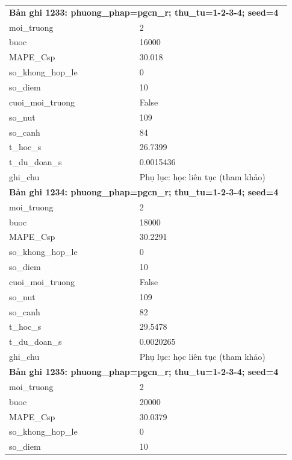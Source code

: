 \begin{longtable}{p{0.43\linewidth}p{0.50\linewidth}}
\midrule
\multicolumn{2}{p{0.95\linewidth}}{\textbf{Bản ghi 1233: phuong\_phap=pgcn\_r; thu\_tu=1-2-3-4; seed=4}} \\
moi\_\allowbreak truong & 2 \\
buoc & 16000 \\
MAPE\_\allowbreak Csp & 30.018 \\
so\_\allowbreak khong\_\allowbreak hop\_\allowbreak le & 0 \\
so\_\allowbreak diem & 10 \\
cuoi\_\allowbreak moi\_\allowbreak truong & False \\
so\_\allowbreak nut & 109 \\
so\_\allowbreak canh & 84 \\
t\_\allowbreak hoc\_\allowbreak s & 26.7399 \\
t\_\allowbreak du\_\allowbreak doan\_\allowbreak s & 0.0015436 \\
ghi\_\allowbreak chu & Phụ lục: học liên tục (tham khảo) \\
\midrule
\multicolumn{2}{p{0.95\linewidth}}{\textbf{Bản ghi 1234: phuong\_phap=pgcn\_r; thu\_tu=1-2-3-4; seed=4}} \\
moi\_\allowbreak truong & 2 \\
buoc & 18000 \\
MAPE\_\allowbreak Csp & 30.2291 \\
so\_\allowbreak khong\_\allowbreak hop\_\allowbreak le & 0 \\
so\_\allowbreak diem & 10 \\
cuoi\_\allowbreak moi\_\allowbreak truong & False \\
so\_\allowbreak nut & 109 \\
so\_\allowbreak canh & 82 \\
t\_\allowbreak hoc\_\allowbreak s & 29.5478 \\
t\_\allowbreak du\_\allowbreak doan\_\allowbreak s & 0.0020265 \\
ghi\_\allowbreak chu & Phụ lục: học liên tục (tham khảo) \\
\midrule
\multicolumn{2}{p{0.95\linewidth}}{\textbf{Bản ghi 1235: phuong\_phap=pgcn\_r; thu\_tu=1-2-3-4; seed=4}} \\
moi\_\allowbreak truong & 2 \\
buoc & 20000 \\
MAPE\_\allowbreak Csp & 30.0379 \\
so\_\allowbreak khong\_\allowbreak hop\_\allowbreak le & 0 \\
so\_\allowbreak diem & 10 \\

\end{longtable}
